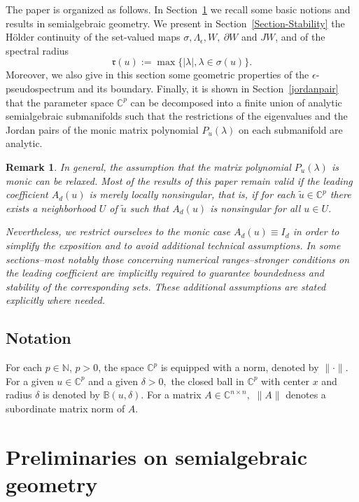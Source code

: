 \documentclass[10pt,reqno]{amsart}
\theoremstyle{break-italic}
\theoremstyle{break-italic}
\theoremstyle{break-italic}
\theoremstyle{break-italic}
\theoremstyle{break-italic}
\theoremstyle{break-italic}
\theoremstyle{break-italic}
\theoremstyle{break-italic}
\theoremstyle{break-roman}
\newtheorem{remark}[satz]{Remark}
\theoremstyle{standard}
\theoremstyle{varthm-roman}
\theoremstyle{varthm-italic}
\theoremstyle{varthm-roman-break}
\theoremstyle{varthm-italic-break}
\theoremstyle{varthm-roman-no-punctuation}
\theoremstyle{varthm-italic-no-punctuation}
\numberwithin{equation}{section}
\begin{document}
The paper is organized as follows. In Section~\ref{SecPreliminaries} we recall some basic notions and results in semialgebraic geometry. We present  in Section~\ref{Section-Stability} the H\"older continuity of  the set-valued maps $\sigma, \Lambda_\epsilon, W, ~\partial W$ and $JW$, and of the spectral radius
$$\mathfrak{r}(u):= \max \{|\lambda|, \lambda \in \sigma(u)\}.$$
Moreover, we also  give in this section some geometric properties of the $\epsilon$-pseudospectrum and its boundary. Finally, it is shown in Section~\ref{jordanpair} that the parameter space $\mathbb{C}^p$ can be decomposed into a finite union of analytic semialgebraic submanifolds such that the restrictions of the eigenvalues and the Jordan pairs of the monic matrix polynomial $P_u(\lambda)$ on each submanifold  are analytic.

\begin{remark}\rm
 In general, the assumption that the matrix polynomial $P_u(\lambda)$ is monic can be relaxed. 
Most of the results of this paper remain valid if the leading coefficient $A_d(u)$ is merely 
\emph{locally nonsingular}, that is, if for each $\tilde u \in \mathbb{C}^p$ there exists a 
neighborhood $U$ of $\tilde u$ such that $A_d(u)$ is nonsingular for all $u \in U$.

Nevertheless, we restrict ourselves to the monic case $A_d(u)\equiv I_d$ in order to simplify the 
exposition and to avoid additional technical assumptions. In some sections--most notably those 
concerning numerical ranges--stronger conditions on the leading coefficient are implicitly 
required to guarantee boundedness and stability of the corresponding sets. These additional 
assumptions are stated explicitly where needed.
\end{remark}


\subsection*{Notation}
For each $p\in \mathbb N$, $p>0$, the space $\mathbb{C}^p$ is equipped with a norm, denoted by $\| \cdot\|.$  For a given $u \in \mathbb{C}^p$ and a given $\delta > 0,$ the closed ball in $\mathbb{C}^p$ with center $x$ and radius $\delta$ is denoted by $\mathbb{B}(u, \delta).$    For a matrix $A \in \mathbb C^{n\times n},$ $\|A\|$ denotes a subordinate matrix norm of $A.$

\section{Preliminaries on  semialgebraic geometry} \label{SecPreliminaries}
\end{document}
